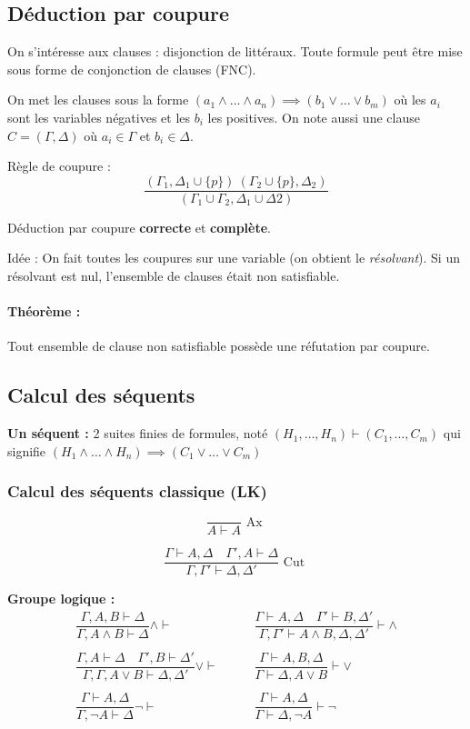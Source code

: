 \documentclass[french]{article}
\begin{document}

\subsection{Déduction par coupure}
On s'intéresse aux clauses : disjonction de littéraux. Toute formule peut être mise sous forme de conjonction de clauses (FNC).

On met les clauses sous la forme $(a_1\wedge\dots\wedge a_n)\implies (b_1\vee\dots\vee b_m)$ où les $a_i$ sont les variables négatives et les $b_i$ les positives. On note aussi une clause $C=(\Gamma,\Delta)$ où $a_i\in\Gamma$ et $b_i\in\Delta$.

Règle de coupure :
$$\dfrac{(\Gamma_1,\Delta_1\cup\{p\})\ (\Gamma_2\cup\{p\}, \Delta_2)}{(\Gamma_1\cup\Gamma_2, \Delta_1\cup\Delta2)}$$

Déduction par coupure \textbf{correcte} et \textbf{complète}.

Idée : On fait toutes les coupures sur une variable (on obtient le \emph{résolvant}). Si un résolvant est nul, l'ensemble de clauses était non satisfiable.

\paragraph{Théorème :} Tout ensemble de clause non satisfiable possède une réfutation par coupure.

\subsection{Calcul des séquents}
\textbf{Un séquent :} 2 suites finies de formules, noté  $(H_1,\dots , H_n)\vdash (C_1,\dots , C_m)$ qui signifie $(H_1\wedge\dots\wedge H_n)\implies (C_1\vee\dots\vee C_m)$

\subsubsection{Calcul des séquents classique (LK)}
\[\dfrac{}{A \vdash A} \text{ Ax }\]

\[\dfrac{\Gamma \vdash A,\Delta \quad \Gamma',A \vdash \Delta}{\Gamma,\Gamma' \vdash \Delta, \Delta'} \text{ Cut }\]

\textbf{Groupe logique :}
\begin{align*}
\dfrac{\Gamma,A,B \vdash \Delta}{\Gamma, A \land B \vdash \Delta} \land \vdash &\qquad 
\dfrac{\Gamma \vdash A,\Delta \quad \Gamma' \vdash B,\Delta'}{\Gamma,\Gamma' \vdash A \land B, \Delta, \Delta'} \vdash \land \\ 
\\
\dfrac{\Gamma, A \vdash\Delta \quad \Gamma', B \vdash \Delta'}{\Gamma,\Gamma,  A \lor B \vdash \Delta, \Delta'} \lor \vdash    &\qquad 
\dfrac{\Gamma \vdash A, B, \Delta}{\Gamma \vdash \Delta, A \lor B} \vdash \lor\\
\\
\dfrac{\Gamma \vdash A, \Delta}{\Gamma, \neg A \vdash \Delta} \neg \vdash  &\qquad 
\dfrac{\Gamma \vdash A,\Delta}{\Gamma \vdash \Delta, \neg A} \vdash \neg
\end{align*}
\end{document}

